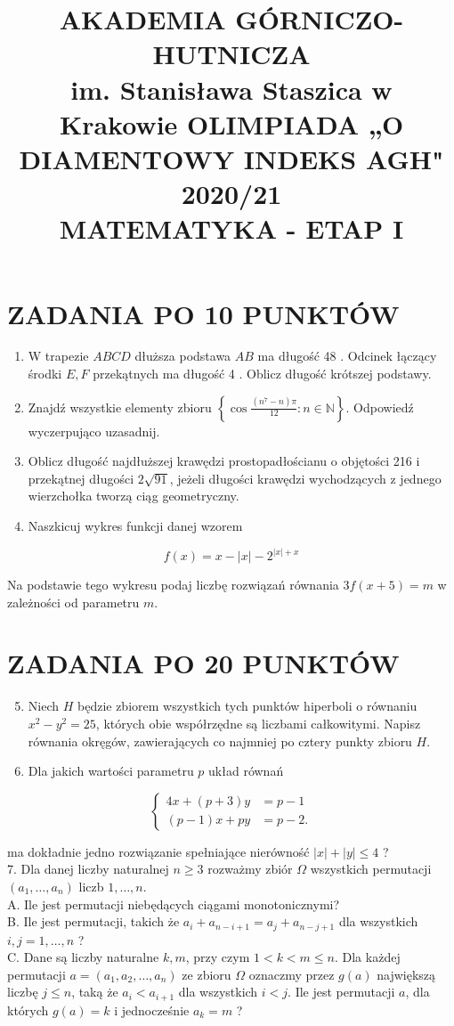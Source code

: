 \documentclass[10pt]{article}
\title{AKADEMIA GÓRNICZO-HUTNICZA \\
 im. Stanisława Staszica w Krakowie OLIMPIADA „O DIAMENTOWY INDEKS AGH" 2020/21 \\
 MATEMATYKA - ETAP I }
\author{}
\date{}
\begin{document}
\maketitle
\section*{ZADANIA PO 10 PUNKTÓW}
\begin{enumerate}
  \item W trapezie $A B C D$ dłuższa podstawa $A B$ ma długość 48 . Odcinek łączący środki $E, F$ przekątnych ma długość 4 . Oblicz długość krótszej podstawy.
  \item Znajdź wszystkie elementy zbioru $\left\{\cos \frac{\left(n^{7}-n\right) \pi}{12}: n \in \mathbb{N}\right\}$. Odpowiedź wyczerpująco uzasadnij.
  \item Oblicz długość najdłuższej krawędzi prostopadłościanu o objętości 216 i przekątnej długości $2 \sqrt{91}$, jeżeli długości krawędzi wychodzących z jednego wierzchołka tworzą ciąg geometryczny.
  \item Naszkicuj wykres funkcji danej wzorem
\end{enumerate}

$$
f(x)=x-|x|-2^{|x|+x}
$$

Na podstawie tego wykresu podaj liczbę rozwiązań równania $3 f(x+5)=m$ w zależności od parametru $m$.

\section*{ZADANIA PO 20 PUNKTÓW}
\begin{enumerate}
  \setcounter{enumi}{4}
  \item Niech $H$ będzie zbiorem wszystkich tych punktów hiperboli o równaniu $x^{2}-y^{2}=25$, których obie współrzędne są liczbami całkowitymi. Napisz równania okręgów, zawierających co najmniej po cztery punkty zbioru $H$.
  \item Dla jakich wartości parametru $p$ układ równań
\end{enumerate}

$$
\left\{\begin{aligned}
4 x+(p+3) y & =p-1 \\
(p-1) x+p y & =p-2 .
\end{aligned}\right.
$$

ma dokładnie jedno rozwiązanie spełniające nierówność $|x|+|y| \leqslant 4$ ?\\
7. Dla danej liczby naturalnej $n \geqslant 3$ rozważmy zbiór $\Omega$ wszystkich permutacji $\left(a_{1}, \ldots, a_{n}\right)$ liczb $1, \ldots, n$.\\
A. Ile jest permutacji niebędących ciągami monotonicznymi?\\
B. Ile jest permutacji, takich że $a_{i}+a_{n-i+1}=a_{j}+a_{n-j+1}$ dla wszystkich $i, j=1, \ldots, n$ ?\\
C. Dane są liczby naturalne $k, m$, przy czym $1<k<m \leqslant n$. Dla każdej permutacji $a=\left(a_{1}, a_{2}, \ldots, a_{n}\right)$ ze zbioru $\Omega$ oznaczmy przez $g(a)$ największą liczbę $j \leqslant n$, taką że $a_{i}<a_{i+1}$ dla wszystkich $i<j$. Ile jest permutacji $a$, dla których $g(a)=k$ i jednocześnie $a_{k}=m$ ?
\end{document}
